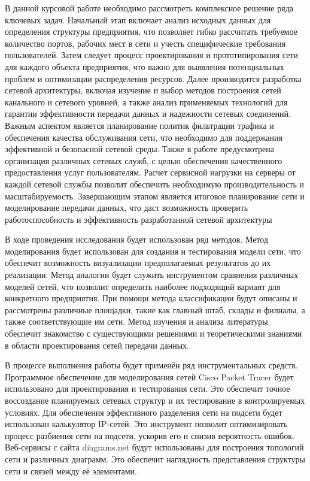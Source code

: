 \documentclass[14pt, a4paper]{extarticle}
\numberwithin{equation}{section}
\begin{document}
В данной курсовой работе необходимо рассмотреть комплексное решение ряда ключевых задач. Начальный этап включает анализ исходных данных для определения структуры предприятия, что позволяет гибко рассчитать требуемое количество портов, рабочих мест в сети и учесть специфические требования пользователей. Затем следует процесс проектирования и прототипирования сети для каждого объекта предприятия, что важно для выявления потенциальных проблем и оптимизации распределения ресурсов.
Далее производится разработка сетевой архитектуры, включая изучение и выбор методов построения сетей канального и сетевого уровней, а также анализ применяемых технологий для гарантии эффективности передачи данных и надежности сетевых соединений. Важным аспектом является планирование политик фильтрации трафика и обеспечения качества обслуживания сети, что необходимо для поддержания эффективной и безопасной сетевой среды.
Также в работе предусмотрена организация различных сетевых служб, с целью обеспечения качественного предоставления услуг пользователям. Расчет сервисной нагрузки на серверы от каждой сетевой службы позволит обеспечить необходимую производительность и масштабируемость. Завершающим этапом является итоговое планирование сети и моделирование передачи данных, что даст возможность проверить работоспособность и эффективность разработанной сетевой архитектуры

В ходе проведения исследования будет использован ряд методов. 
Метод моделирования будет использован для создания и тестирования 
модели сети,  что обеспечит возможность визуализации предполагаемых 
результатов до их реализации. Метод аналогии будет служить инструментом 
сравнения различных моделей сетей,  что позволит определить наиболее 
подходящий вариант для конкретного предприятия. При помощи метода 
классификации будут описаны и рассмотрены различные площадки, 
такие как главный штаб, склады и филиалы, а также соответствующие им сети. 
Метод изучения и анализа литературы обеспечит знакомство 
с существующими решениями и теоретическими знаниями в области 
проектирования сетей передачи данных.

В процессе выполнения работы будет применён ряд 
инструментальных средств. 
Программное обеспечение для моделирования сетей Cisco 
Packet Tracer будет использовано для проектирования 
и тестирования сети. Это обеспечит точное 
воссоздание планируемых сетевых структур и их 
тестирование в контролируемых условиях. 
Для обеспечения эффективного разделения сети на 
подсети будет использован калькулятор IP-сетей. 
Это инструмент позволит оптимизировать процесс 
разбиения сети на подсети, ускорив его и 
снизив вероятность ошибок. Веб-сервисы с сайта 
diagrams.net будут использованы для построения 
топологий сети и различных диаграмм. 
Это обеспечит наглядность представления 
структуры сети и связей между её элементами.
\end{document}
